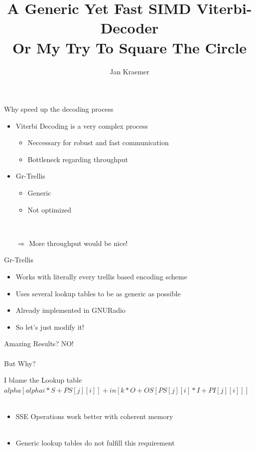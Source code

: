 \documentclass[18pt]{beamer}
\title[A Generic Yet Fast Viterbi Decoder]{A Generic Yet Fast SIMD Viterbi-Decoder\\ Or My Try To Square The Circle}
\subtitle{}
\author{Jan Kraemer}
\institute{Communications Engineering Lab}
\begin{document}

\begin{frame}
\titlepage
\end{frame}


\begin{frame}{Why speed up the decoding process}
\begin{itemize}
\item Viterbi Decoding is a very complex process
\begin{itemize}
	\item Neccessary for robust and fast communication
	\item Bottleneck regarding throughput
\end{itemize}
\pause
\item Gr-Trellis
\begin{itemize}
	\item Generic
	\item Not optimized
\end{itemize}
\pause
~ \newline
\item[$\Rightarrow$] More throughput would be nice!
\end{itemize}
\end{frame}

\begin{frame}{Gr-Trellis}
\begin{itemize}
\item Works with literally every trellis based encoding scheme  
\pause
\item Uses several lookup tables to be as generic as possible
\pause
\item Already implemented in GNURadio
\pause  
\item So let's just modify it!
\end{itemize}
\end{frame}


\begin{frame}{Amazing Results?}
\Huge NO!\\
~\\
\pause
\Large But Why?
\end{frame}
\begin{frame}{I blame the Lookup table}
$alpha[alphai*S+PS[j][i]]+in[k*O+OS[PS[j][i]*I+PI[j][i]]]$\\
~\\

\begin{itemize}
	\item SSE Operations work better with coherent memory\\~\\
	\item Generic lookup tables do not fulfill this requirement
\end{itemize}
\end{frame}
\end{document}
